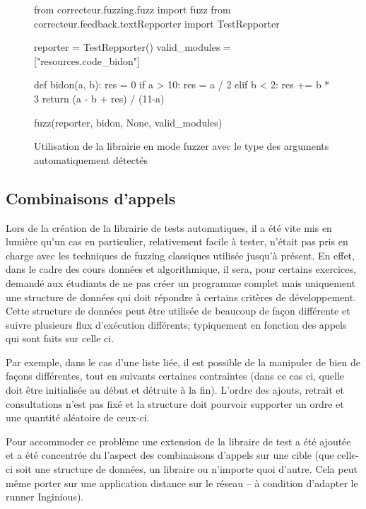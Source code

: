 \documentclass[a4paper]{report}
\begin{document}
\begin{figure}[ht]
\begin{python}
from correcteur.fuzzing.fuzz import fuzz
from correcteur.feedback.textRepporter import TestRepporter


reporter = TestRepporter()
valid_modules = ["resources.code_bidon"]

def bidon(a, b):
    res = 0
    if a > 10:
        res = a / 2
    elif b < 2:
        res += b * 3
    return (a - b + res) / (11-a)


fuzz(reporter,
	bidon,
	None,
	valid_modules)
\end{python}
	\caption{Utilisation de la librairie en mode fuzzer avec le type des arguments automatiquement détectés}
	
	\label{fig:fuzzer_no_args}
\end{figure}


\subsection{Combinaisons d'appels}

Lors de la création de la librairie de tests automatiques, il a été vite mis en lumière qu'un cas en particulier, relativement facile à tester, n'était pas pris en charge avec les techniques de fuzzing classiques utilisée jusqu’à présent.
En effet, dans le cadre des cours données et algorithmique, il sera, pour certains exercices, demandé aux étudiants de ne pas créer un programme complet mais uniquement une structure de données qui doit répondre à certains critères de développement.
Cette structure de données peut être utilisée de beaucoup de façon différente et suivre plusieurs flux d'exécution différents; typiquement en fonction des appels qui sont faits sur celle ci.

Par exemple, dans le cas d'une liste liée, il est possible de la manipuler de bien de façons différentes, tout en suivants certaines contraintes (dans ce cas ci, quelle doit être initialisée au début et détruite à la fin).
L'ordre des ajouts, retrait et consultations n'est pas fixé et la structure doit pourvoir supporter un ordre et une quantité aléatoire de ceux-ci.

Pour accommoder ce problème une extension de la libraire de test a été ajoutée et a été concentrée du l'aspect des combinaisons d'appels sur une cible (que celle-ci soit une structure de données, un libraire ou n'importe quoi d'autre. Cela peut même porter sur une application distance sur le réseau – à condition d'adapter le runner Inginious).
\end{document}
